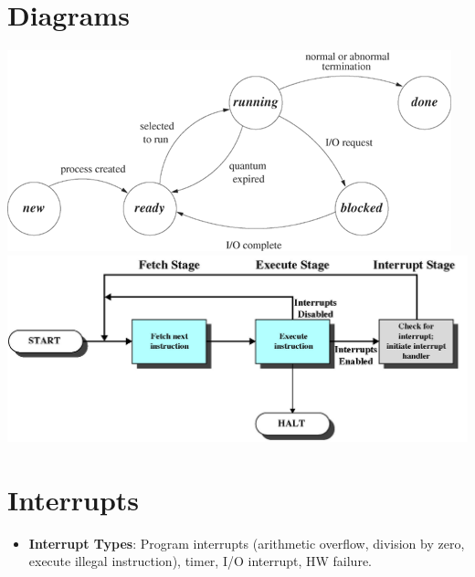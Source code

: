 \documentclass[fontsize=5pt]{scrartcl}
\begin{document}
\begin{multicols}{3}
  \section{Diagrams}
    \includegraphics[scale=0.2]{process_state.png} \\
    \includegraphics[scale=0.2]{interrupt_cycle.png} \\
    
   \section{Interrupts}
      \begin{itemize}
        \item \textbf{Interrupt Types}: Program interrupts (arithmetic overflow, division by zero, execute illegal instruction), timer, I/O interrupt, HW failure.
      \end{itemize}

\end{multicols}
\end{document}
